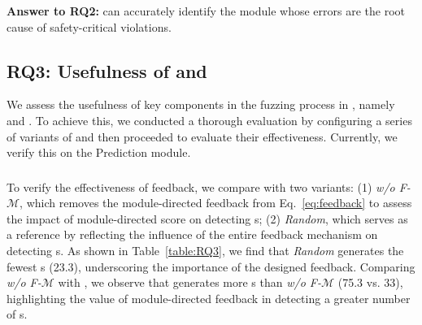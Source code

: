 \begin{ansbox}
    \textbf{Answer to RQ2:} \oracle can accurately identify the module whose errors are the root cause of safety-critical violations.
\end{ansbox}


\begin{table}[!t]
\caption{Results of ablation study on Prediction module.}
\vspace{-10pt}
    \centering
    \vspace{-10pt}
\label{table:RQ3}
\end{table}
\subsection{RQ3: Usefulness of \feedback and \select}
We assess the usefulness of key components in the fuzzing process in \tool, namely \feedback and \select. To achieve this, we conducted a thorough evaluation by configuring a series of variants of \tool and then proceeded to evaluate their effectiveness. Currently, we verify this on the Prediction module. 


\subsubsection{\feedback} To verify the effectiveness of feedback, we compare \tool with two variants: (1) \textit{w/o F-$\mathcal{M}$}, which removes the module-directed feedback from Eq.~\ref{eq:feedback} to assess the impact of module-directed score on detecting {\mccs}s; (2) \textit{Random}, which serves as a reference by reflecting the influence of the entire feedback mechanism on detecting {\mccs}s.
As shown in Table~\ref{table:RQ3}, we find that \textit{Random} generates the fewest {\mccs}s (23.3), underscoring the importance of the designed feedback. Comparing \textit{w/o F-$\mathcal{M}$} with \tool, we observe that \tool generates more {\mccs}s than \textit{w/o F-$\mathcal{M}$} (75.3 vs. 33), highlighting the value of module-directed feedback in detecting a greater number of {\mccs}s.

